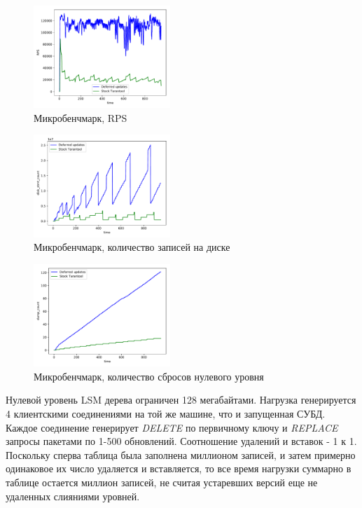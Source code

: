 \documentclass[a4paper,hidelinks,12pt]{article}
\begin{document}
\begin{figure}
\centering
\includegraphics[width=0.46\textwidth]{rps_microbench}
\caption{Микробенчмарк, RPS}
\label{fig:rps_microbench}
\end{figure}

\begin{figure}
\centering
\includegraphics[width=0.46\textwidth]{disk_stmt_microbench}
\caption{Микробенчмарк, количество записей на диске}
\label{fig:disk_stmt_microbench}
\end{figure}

\begin{figure}
\centering
\includegraphics[width=0.46\textwidth]{dump_count_microbench}
\caption{Микробенчмарк, количество сбросов нулевого уровня}
\label{fig:dump_count_microbench}
\end{figure}

Нулевой уровень LSM дерева ограничен 128 мегабайтами. Нагрузка генерируется 4
клиентскими соединениями на той же машине, что и запущенная СУБД. Каждое
соединение генерирует \textit{DELETE} по первичному ключу и \textit{REPLACE}
запросы пакетами по 1-500 обновлений. Соотношение удалений и вставок - 1 к 1.
Поскольку сперва таблица была заполнена миллионом записей, и затем примерно
одинаковое их число удаляется и вставляется, то все время нагрузки суммарно в
таблице остается миллион записей, не считая устаревших версий еще не удаленных
слияниями уровней.
\end{document}
